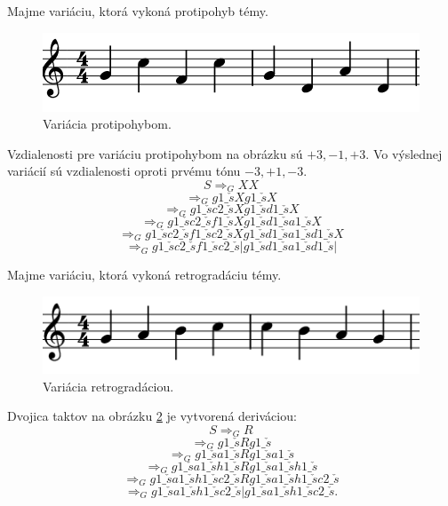 \begin{example}
Majme variáciu, ktorá vykoná protipohyb témy.
\begin{figure}[H]
    \centering
    \includegraphics[scale=0.4]{thesis/obrazky-figures/contraryvar.png}
    \caption{Variácia protipohybom.}
    \label{fig:potrivar}
    \end{figure}
    Vzdialenosti pre variáciu protipohybom na obrázku sú $+3, -1, +3$. Vo výslednej variácií sú vzdialenosti oproti prvému tónu $-3, +1, -3$.
    $$ S \Rightarrow_G XX $$
    $$ \Rightarrow_G g1\_\check{s}Xg1\_\check{s}X $$
    $$ \Rightarrow_G g1\_\check{s}c2\_\check{s}Xg1\_\check{s}d1\_\check{s}X $$
    $$ \Rightarrow_G g1\_\check{s}c2\_\check{s}f1\_\check{s}Xg1\_\check{s}d1\_\check{s}a1\_\check{s}X $$
    $$ \Rightarrow_G g1\_\check{s}c2\_\check{s}f1\_\check{s}c2\_\check{s}Xg1\_\check{s}d1\_\check{s}a1\_\check{s}d1\_\check{s}X $$
    $$ \Rightarrow_G g1\_\check{s}c2\_\check{s}f1\_\check{s}c2\_\check{s}|g1\_\check{s}d1\_\check{s}a1\_\check{s}d1\_\check{s}| $$
\end{example}

\begin{example}
Majme variáciu, ktorá vykoná retrogradáciu témy.
\begin{figure}[H]
    \centering
    \includegraphics[scale=0.4]{thesis/obrazky-figures/retgradvar.png}
    \caption{Variácia retrogradáciou.}
    \label{fig:retrogradvar}
    \end{figure}
    Dvojica taktov na obrázku \ref{fig:retrogradvar} je vytvorená deriváciou:
    $$ S \Rightarrow_G R $$
    $$ \Rightarrow_G g1\_\check{s}Rg1\_\check{s} $$
    $$ \Rightarrow_G g1\_\check{s}a1\_\check{s}Rg1\_\check{s}a1\_\check{s}$$
    $$ \Rightarrow_G g1\_\check{s}a1\_\check{s}h1\_\check{s}Rg1\_\check{s}a1\_\check{s}h1\_\check{s}$$
    $$ \Rightarrow_G g1\_\check{s}a1\_\check{s}h1\_\check{s}c2\_\check{s}Rg1\_\check{s}a1\_\check{s}h1\_\check{s}c2\_\check{s}$$
    $$ \Rightarrow_G g1\_\check{s}a1\_\check{s}h1\_\check{s}c2\_\check{s}|g1\_\check{s}a1\_\check{s}h1\_\check{s}c2\_\check{s}.$$
\end{example}

